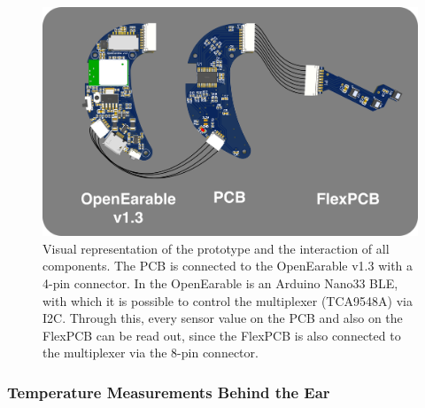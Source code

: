 \begin{figure}
    \centering
    \includegraphics[width=\textwidth]{thesis-doc/images/prototype/PrototypeConnection.png}
    \caption{Visual representation of the prototype and the interaction of all components. The PCB is connected to the OpenEarable v1.3 with a 4-pin connector. In the OpenEarable is an Arduino Nano33 BLE, with which it is possible to control the multiplexer (TCA9548A) via I2C. Through this, every sensor value on the PCB and also on the FlexPCB can be read out, since the FlexPCB is also connected to the multiplexer via the 8-pin connector.}
    \label{fig:design:prototype_connection}
\end{figure}

\subsubsection{Temperature Measurements Behind the Ear}
\label{ch:Design:Prototype:BehindEar}

